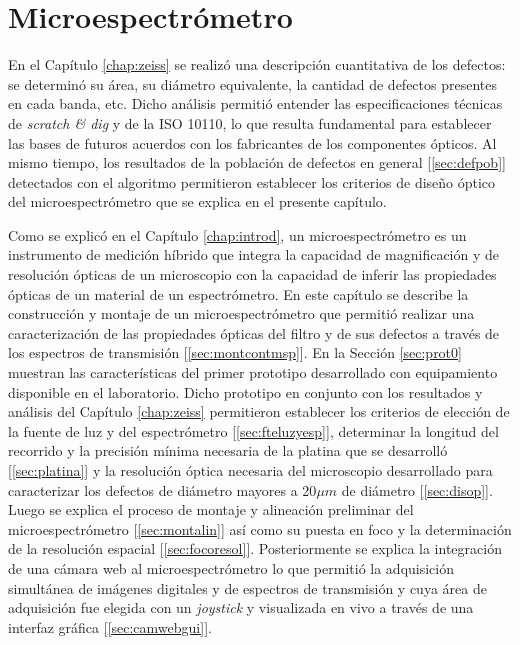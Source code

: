 \singlespacing
\chapter{Microespectrómetro}
\label{chap:microsp}

\hspace{0.5cm}En el Capítulo \ref{chap:zeiss} se realizó una descripción cuantitativa de los defectos: se determinó su área, su diámetro equivalente, la cantidad de defectos presentes en cada banda, etc. Dicho análisis permitió entender las especificaciones técnicas de \textit{scratch \& dig} y de la ISO 10110, lo que resulta fundamental para establecer las bases de futuros acuerdos con los fabricantes de los componentes ópticos. Al mismo tiempo, los resultados de la población de defectos en general [\ref{sec:defpob}] detectados con el algoritmo permitieron establecer los criterios de diseño óptico del microespectrómetro que se explica en el presente capítulo.

Como se explicó en el Capítulo \ref{chap:introd}, un microespectrómetro es un instrumento de medición híbrido que integra la capacidad de magnificación y de resolución ópticas de un microscopio con la capacidad de inferir las propiedades ópticas de un material de un espectrómetro. En este capítulo se describe la construcción y montaje de un microespectrómetro que permitió realizar una caracterización de las propiedades ópticas del filtro y de sus defectos a través de los espectros de transmisión [\ref{sec:montcontmsp}]. En la Sección \ref{sec:prot0} muestran las características del primer prototipo desarrollado con equipamiento disponible en el laboratorio. Dicho prototipo en conjunto con los resultados y análisis del Capítulo \ref{chap:zeiss} permitieron establecer los criterios de elección de la fuente de luz y del espectrómetro [\ref{sec:fteluzyesp}], determinar la longitud del recorrido y la precisión mínima necesaria de la platina que se desarrolló [\ref{sec:platina}] y la resolución óptica necesaria del microscopio desarrollado para caracterizar los defectos de diámetro mayores a 20$\mu m$ de diámetro [\ref{sec:disop}]. Luego se explica el proceso de montaje y alineación preliminar del microespectrómetro [\ref{sec:montalin}] así como su puesta en foco y la determinación de la resolución espacial [\ref{sec:focoresol}]. Posteriormente se explica la integración de una cámara web al microespectrómetro lo que permitió la adquisición simultánea de imágenes digitales y de espectros de transmisión y cuya área de adquisición fue elegida con un \textit{joystick} y visualizada en vivo a través de una interfaz gráfica [\ref{sec:camwebgui}].

